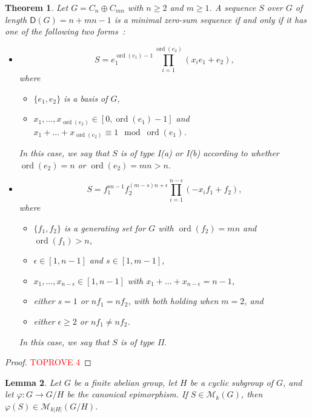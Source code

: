 \documentclass[11pt]{amsart}
\newtheorem{theorem}{Theorem}[section]
\newtheorem{lemma}[theorem]{Lemma}
\theoremstyle{definition}
\DeclareMathOperator{\ord}{ord}
\numberwithin{equation}{section}
\begin{document}
 


\begin{theorem}  \label{inverse}
	Let  $G = C_{n} \oplus C_{mn}$  with $n\geq 2$  and $m \ge 1$.  A sequence $S$
	over $G$ of length $\mathsf D (G) = n+mn-1$ is a minimal zero-sum
	sequence if and only if it has one of the following two forms{\rm
		\,:}
	\begin{itemize}
		\medskip
		\item[(I)] \[
		S = e_1^{\ord (e_1)-1} \prod_{i=1}^{\ord (e_2)}
		(x_{i}e_1+e_2),
		\]where
		\begin{itemize}\item[(a)] $\{e_1, e_2\}$ is a basis of $G$,
			\item[(b)] $x_1, \ldots, x_{\ord (e_2)}  \in
			[0, \ord (e_1)-1]$ and $x_1 + \ldots + x_{\ord (e_2)} \equiv 1
			\mod \ord (e_1)$. \end{itemize} In this case, we say that $S$ is of type I(a) or I(b) according to whether $\ord(e_2)=n$ or $\ord(e_2)=mn>n$.
		
		\medskip
		\item[(II)] \[
		S = f_1^{sn - 1} f_2^{(m-s)n+\epsilon}\prod_{i=1}^{n-\epsilon} ( -x_{i} f_1 +
		f_2),
		\] where
		\begin{itemize}
			\item[(a)] $\{f_1, f_2\}$ is a generating set for  $G$ with $\ord (f_2) =
			mn$ and $\ord(f_1)>n$,
			\item[(b)] $\epsilon\in [1,n-1]$  and
			$s \in [1, m-1]$,
			\item[(c)] $x_1, \ldots, x_{n-\epsilon} \in [1, n-1]$ with $x_1 + \ldots + x_{n-\epsilon} = n-1$,  \item[(d)] either  $s=1$ or
			$nf_1 = nf_2$, with both holding when $m=2$, and
			\item[(e)] either $\epsilon\geq 2$  or $nf_1\neq nf_2$.\end{itemize} In this case, we say that $S$ is of type II.
	\end{itemize}
\end{theorem}

\begin{proof}\textcolor{red}{TOPROVE 4}\end{proof}






\begin{lemma}\label{le-epi}
	Let $G$ be a finite abelian group, let $H$ be a cyclic subgroup of $G$, and let $\varphi\colon G\rightarrow G/H$ be the canonical epimorphism.
	If $S\in \mathcal M_k(G)$, then $\varphi(S)\in \mathcal M_{k|H|}(G/H)$.
\end{lemma}
\end{document}

